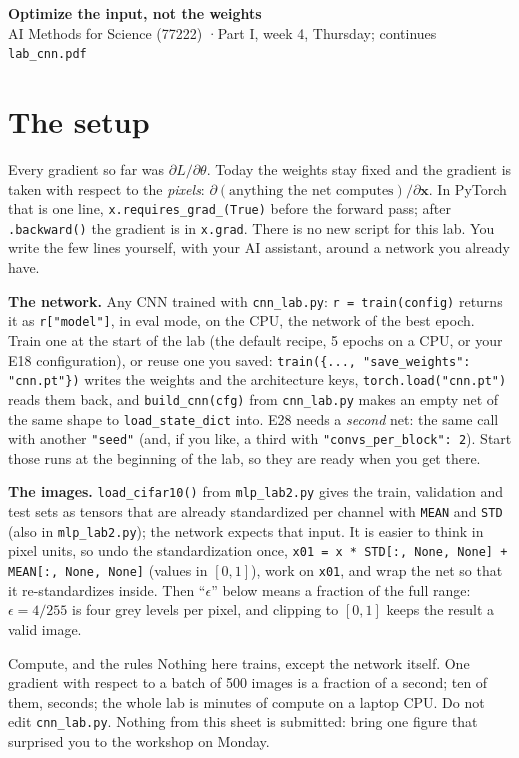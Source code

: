 \documentclass[11pt]{article}
\newcommand{\code}[1]{\texttt{#1}}
\newcounter{exp}
\begin{document}
\sloppy
\begin{center}
{\Large\bfseries Optimize the input, not the weights}\\[3pt]
AI Methods for Science (77222) \quad·\quad Part I, week 4, Thursday; continues \code{lab\_cnn.pdf}
\end{center}

\section*{The setup}
Every gradient so far was $\partial L/\partial\theta$. Today the weights stay fixed and the gradient is taken with respect to the \emph{pixels}: $\partial(\text{anything the net computes})/\partial\mathbf x$. In PyTorch that is one line, \code{x.requires\_grad\_(True)} before the forward pass; after \code{.backward()} the gradient is in \code{x.grad}. There is no new script for this lab. You write the few lines yourself, with your AI assistant, around a network you already have.

\textbf{The network.} Any CNN trained with \code{cnn\_lab.py}: \code{r = train(config)} returns it as \code{r["model"]}, in eval mode, on the CPU, the network of the best epoch. Train one at the start of the lab (the default recipe, 5 epochs on a CPU, or your E18 configuration), or reuse one you saved: \code{train(\{..., "save\_weights": "cnn.pt"\})} writes the weights and the architecture keys, \code{torch.load("cnn.pt")} reads them back, and \code{build\_cnn(cfg)} from \code{cnn\_lab.py} makes an empty net of the same shape to \code{load\_state\_dict} into. E28 needs a \emph{second} net: the same call with another \code{"seed"} (and, if you like, a third with \code{"convs\_per\_block": 2}). Start those runs at the beginning of the lab, so they are ready when you get there.

\textbf{The images.} \code{load\_cifar10()} from \code{mlp\_lab2.py} gives the train, validation and test sets as tensors that are already standardized per channel with \code{MEAN} and \code{STD} (also in \code{mlp\_lab2.py}); the network expects that input. It is easier to think in pixel units, so undo the standardization once, \code{x01 = x * STD[:, None, None] + MEAN[:, None, None]} (values in $[0,1]$), work on \code{x01}, and wrap the net so that it re-standardizes inside. Then ``$\epsilon$'' below means a fraction of the full range: $\epsilon = 4/255$ is four grey levels per pixel, and clipping to $[0,1]$ keeps the result a valid image.

\begin{rules}{Compute, and the rules}
Nothing here trains, except the network itself. One gradient with respect to a batch of 500 images is a fraction of a second; ten of them, seconds; the whole lab is minutes of compute on a laptop CPU. Do not edit \code{cnn\_lab.py}. Nothing from this sheet is submitted: bring one figure that surprised you to the workshop on Monday.
\end{rules}
\end{document}
